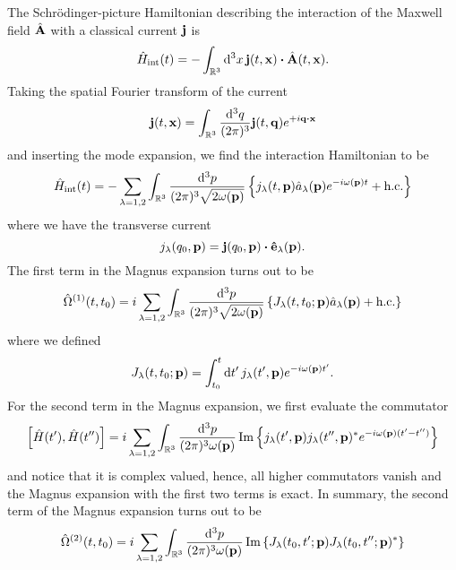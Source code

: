 The Schrödinger-picture Hamiltonian describing the interaction of the Maxwell field $\hat{\vb{A}}$ with a classical current $\vb{j}$ is
\begin{equation}
	\hat{H}_\text{int}(t)
	=
	-
	\int_{\mathbb{R}^3}\dd[3]{x}
	\vb{j}(t,\vb{x})
	\vdot
	\hat{\vb{A}}(t,\vb{x})
	.
\end{equation}
Taking the spatial Fourier transform of the current
\begin{equation}
	\vb{j}(t,\vb{x})
	=
	\int_{\mathbb{R}^3}\frac{\dd[3]{q}}{(2\pi)^3}
	\vb{j}(t,\vb{q})
	e^{+i\vb{q}\vdot\vb{x}}
\end{equation}
and inserting the mode expansion, we find the interaction Hamiltonian to be
\begin{equation}
	\hat{H}_\text{int}(t)
	=
	-
	\sum_{\lambda=1,2}
	\int_{\mathbb{R}^3}\frac{\dd[3]{p}}{(2\pi)^3\sqrt{2\omega(\vb{p})}}
	\left\{
		j_\lambda(t,\vb{p})
		\hat{a}_\lambda(\vb{p})
		e^{-i\omega(\vb{p})t}
		+
		\text{h.c.}
	\right\}
\end{equation}
where we have the transverse current
\begin{equation}
	j_\lambda(q_0,\vb{p})
	=
	\vb{j}(q_0,\vb{p})
	\vdot
	\vu{e}_\lambda(\vb{p})
	.
\end{equation}
The first term in the Magnus expansion turns out to be
\begin{equation}
	\hat{\Omega}^{(1)}(t,t_0)
	=
	i
	\sum_{\lambda=1,2}
	\int_{\mathbb{R}^3}\frac{\dd[3]{p}}{(2\pi)^3\sqrt{2\omega(\vb{p})}}
	\left\{
		J_\lambda(t,t_0;\vb{p})
		\hat{a}_\lambda(\vb{p})
		+
		\text{h.c.}
	\right\}
\end{equation}
where we defined
\begin{equation}
	J_\lambda(t,t_0;\vb{p})
	=
	\int_{t_0}^t\dd{t^\prime}
	j_\lambda(t^\prime,\vb{p})
	e^{-i\omega(\vb{p})t^\prime}
	.
\end{equation}
For the second term in the Magnus expansion, we first evaluate the commutator
\begin{equation}
	\comm{\hat{H}(t^\prime)}{\hat{H}(t^{\prime\prime})}
	=
	i\sum_{\lambda=1,2}
	\int_{\mathbb{R}^3}\frac{\dd[3]{p}}{(2\pi)^3\omega(\vb{p})}
	\Im\left\{
		j_\lambda(t^\prime,\vb{p})
		j_\lambda(t^{\prime\prime},\vb{p})^*
		e^{-i\omega(\vb{p})(t^\prime-t^{\prime\prime})}
	\right\}
\end{equation}
and notice that it is complex valued, hence, all higher commutators vanish and the Magnus expansion with the first two terms is exact.
In summary, the second term of the Magnus expansion turns out to be
\begin{equation}
	\hat{\Omega}^{(2)}(t,t_0)
	=
	i\sum_{\lambda=1,2}
	\int_{\mathbb{R}^3}\frac{\dd[3]{p}}{(2\pi)^3\omega(\vb{p})}
	\operatorname{\operatorname{Im}}\left\{
		J_\lambda(t_0,t^\prime;\vb{p})
		J_\lambda(t_0,t^{\prime\prime};\vb{p})^*
	\right\}
\end{equation}
